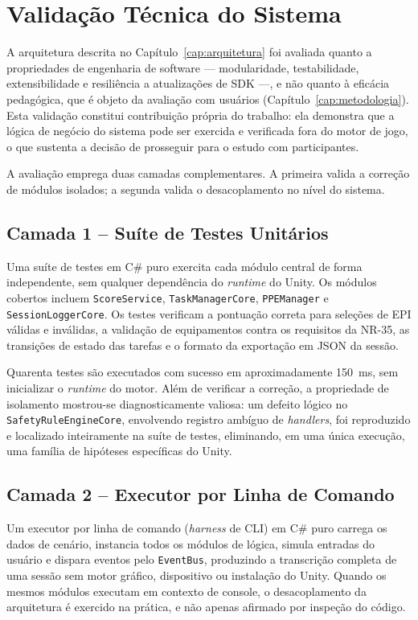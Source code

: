 \chapter{Validação Técnica do Sistema}
\label{cap:validacao}

A arquitetura descrita no Capítulo~\ref{cap:arquitetura} foi avaliada quanto a propriedades de engenharia de software --- modularidade, testabilidade, extensibilidade e resiliência a atualizações de \gls{SDK} ---, e não quanto à eficácia pedagógica, que é objeto da avaliação com usuários (Capítulo~\ref{cap:metodologia}). Esta validação constitui contribuição própria do trabalho: ela demonstra que a lógica de negócio do sistema pode ser exercida e verificada fora do motor de jogo, o que sustenta a decisão de prosseguir para o estudo com participantes.

A avaliação emprega duas camadas complementares. A primeira valida a correção de módulos isolados; a segunda valida o desacoplamento no nível do sistema.

\section{Camada 1 -- Suíte de Testes Unitários}

Uma suíte de testes em C\# puro exercita cada módulo central de forma independente, sem qualquer dependência do \textit{runtime} do Unity. Os módulos cobertos incluem \texttt{ScoreService}, \texttt{TaskManagerCore}, \texttt{PPEManager} e \texttt{SessionLoggerCore}. Os testes verificam a pontuação correta para seleções de EPI válidas e inválidas, a validação de equipamentos contra os requisitos da NR-35, as transições de estado das tarefas e o formato da exportação em \gls{JSON} da sessão.

Quarenta testes são executados com sucesso em aproximadamente 150~ms, sem inicializar o \textit{runtime} do motor. Além de verificar a correção, a propriedade de isolamento mostrou-se diagnosticamente valiosa: um defeito lógico no \texttt{SafetyRuleEngineCore}, envolvendo registro ambíguo de \textit{handlers}, foi reproduzido e localizado inteiramente na suíte de testes, eliminando, em uma única execução, uma família de hipóteses específicas do Unity.

\section{Camada 2 -- Executor por Linha de Comando}

Um executor por linha de comando (\textit{harness} de \gls{CLI}) em C\# puro carrega os dados de cenário, instancia todos os módulos de lógica, simula entradas do usuário e dispara eventos pelo \texttt{EventBus}, produzindo a transcrição completa de uma sessão sem motor gráfico, dispositivo ou instalação do Unity. Quando os mesmos módulos executam em contexto de console, o desacoplamento da arquitetura é exercido na prática, e não apenas afirmado por inspeção do código.


